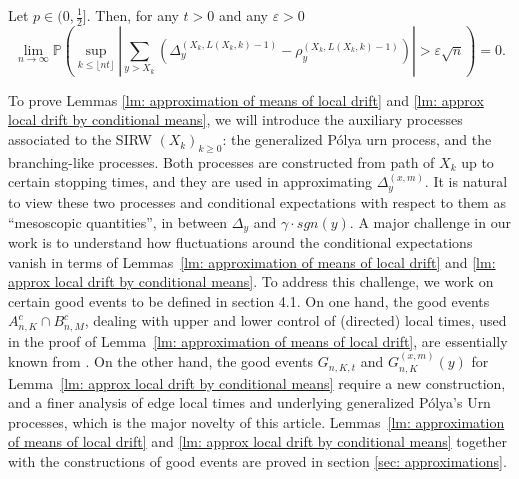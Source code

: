 \documentclass[EJP]{ejpecp} %
\newcommand{\abs}[1]{\left\vert #1 \right\vert}
\begin{document}
\begin{lemma}\label{lm: approx local drift by conditional means}
	Let $p\in (0,\frac{1}{2}]$. Then, for any $t>0$ and any $\varepsilon >0$
	\begin{equation}
		\lim_{n \to \infty }\mathbb{P}\left(\sup_{k\leq\lfloor nt \rfloor} \abs{\sum_{y> X_k} \left(\Delta_{y}^{(X_k,L(X_k,k)-1)}- \rho_{y}^{(X_k,L(X_k,k)-1)} \right)   }  > \varepsilon \sqrt{n}  \right) =0. 
	\end{equation}
\end{lemma}



To prove Lemmas \ref{lm: approximation of means of local drift} and \ref{lm: approx local drift by conditional means}, we will introduce the auxiliary processes associated to the SIRW $(X_k)_{k\geq 0}$: the generalized P\'{o}lya urn process, and the branching-like processes. Both processes are constructed from path of $X_k$ up to certain stopping times, and they are used in approximating $\Delta_{y}^{(x,m)}$.
It is natural to view these two processes and conditional expectations with respect to them as ``mesoscopic quantities'', in between $\Delta_y$ and $\gamma\cdot sgn(y)$.
A major challenge in our work is to understand how fluctuations around the conditional expectations vanish in terms of Lemmas~\ref{lm: approximation of means of local drift} and \ref{lm: approx local drift by conditional means}.
To address this challenge, we work on certain good events to be defined in section 4.1.
On one hand, the good events $A_{n, K}^c \cap B_{n, M}^c$, dealing with upper and lower control of (directed) local times, used in the proof of Lemma~\ref{lm: approximation of means of local drift}, are essentially known from \cite{KMP23}.
On the other hand, the good events $G_{n, K, t}$ and $G_{n, K}^{(x, m)}(y)$ for Lemma~\ref{lm: approx local drift by conditional means} require a new construction, and a finer analysis of edge local times and underlying generalized P\'olya’s Urn processes, which is the major novelty of this article. 
Lemmas~\ref{lm: approximation of means of local drift} and \ref{lm: approx local drift by conditional means} together with the constructions of good events are proved in section \ref{sec: approximations}.
\end{document}
